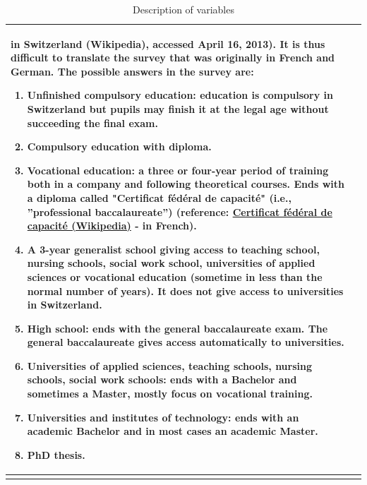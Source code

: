 \documentclass[12pt,a4paper]{article}
\let\OrigUnderscore\_
\def\_{\OrigUnderscore\penalty0\hspace{0pt}}%
\begin{document}
\begin{longtable}{p{4cm}|p{10.5cm}}
{                  in Switzerland (Wikipedia)}, accessed April 16,
                2013). It is thus difficult to translate the survey
                that was originally in French and German. The possible
                answers in the survey are:
		\begin{enumerate}
			\item Unfinished compulsory education:
                          education is compulsory in Switzerland but
                          pupils may finish it at the legal age
                          without succeeding the final exam.
			\item Compulsory education with diploma.
			\item Vocational education: a three or
                          four-year period of training both in a
                          company and following theoretical
                          courses. Ends with a diploma called
                          "Certificat fédéral de capacité" (i.e.,
                          ''professional baccalaureate'') (reference:
                          \href{https://fr.wikipedia.org/wiki/Certificat\_f\%C3\%A9d\%C3\%A9ral\_de\_capacit\%C3\%A9}{Certificat
                            fédéral de capacité (Wikipedia)} - in
                          French).
			\item A 3-year generalist school giving access
                          to teaching school, nursing schools, social
                          work school, universities of applied
                          sciences or vocational education (sometime
                          in less than the normal number of years). It
                          does not give access to universities in
                          Switzerland.
			\item High school: ends with the general
                          baccalaureate exam. The general
                          baccalaureate gives access automatically to
                          universities.
			\item Universities of applied sciences,
                          teaching schools, nursing schools, social
                          work schools: ends with a Bachelor and
                          sometimes a Master, mostly focus on
                          vocational training.
			\item Universities and institutes of
                          technology: ends with an academic Bachelor
                          and in most cases an academic Master.
			\item PhD thesis.
		\end{enumerate}\\
	\hline
		\caption{Description of variables}
		\label{tab:variables}
	\end{longtable}
\end{document}
